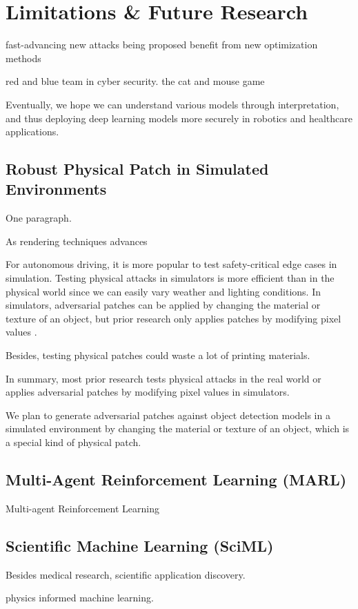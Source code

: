\section{Limitations \& Future Research}

fast-advancing new attacks being proposed benefit from new optimization methods

red and blue team in cyber security.  the cat and mouse game

Eventually, we hope we can understand various models through interpretation, and thus deploying deep learning models more securely in robotics and healthcare applications.

\subsection{Robust Physical Patch in Simulated Environments}

One paragraph.

As rendering techniques advances

For autonomous driving, it is more popular to test safety-critical edge cases in simulation. Testing physical attacks in simulators is more efficient than in the physical world since we can easily vary weather and lighting conditions. In simulators, adversarial patches can be applied by changing the material or texture of an object, but prior research only applies patches by modifying pixel values \citep{mathov2021enhancing} \citep{nesti2022evaluating} \citep{rossolini2022realworld}.

Besides, testing physical patches could waste a lot of printing materials.

In summary, most prior research tests physical attacks in the real world or applies adversarial patches by modifying pixel values in simulators.

We plan to generate adversarial patches against object detection models in a simulated environment by changing the material or texture of an object, which is a special kind of physical patch.

\subsection{Multi-Agent Reinforcement Learning (MARL)}

Multi-agent Reinforcement Learning


\subsection{Scientific Machine Learning (SciML)}

Besides medical research, scientific application discovery.

physics informed machine learning.
